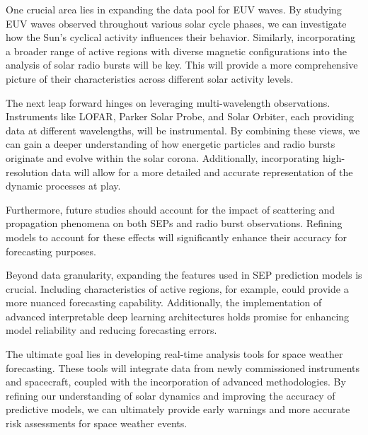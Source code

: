 One crucial area lies in expanding the data pool for EUV waves. By studying EUV waves observed throughout various solar cycle phases, we can investigate how the Sun's cyclical activity influences their behavior. Similarly, incorporating a broader range of active regions with diverse magnetic configurations into the analysis of solar radio bursts will be key. This will provide a more comprehensive picture of their characteristics across different solar activity levels.

The next leap forward hinges on leveraging multi-wavelength observations. Instruments like LOFAR, Parker Solar Probe, and Solar Orbiter, each providing data at different wavelengths, will be instrumental. By combining these views, we can gain a deeper understanding of how energetic particles and radio bursts originate and evolve within the solar corona. Additionally, incorporating high-resolution data will allow for a more detailed and accurate representation of the dynamic processes at play.

Furthermore, future studies should account for the impact of scattering and propagation phenomena on both SEPs and radio burst observations. Refining models to account for these effects will significantly enhance their accuracy for forecasting purposes.

Beyond data granularity, expanding the features used in SEP prediction models is crucial.  Including characteristics of active regions, for example, could provide a more nuanced forecasting capability.  Additionally, the implementation of advanced interpretable deep learning architectures holds promise for enhancing model reliability and reducing forecasting errors.

The ultimate goal lies in developing real-time analysis tools for space weather forecasting. These tools will integrate data from newly commissioned instruments and spacecraft, coupled with the incorporation of advanced methodologies. By refining our understanding of solar dynamics and improving the accuracy of predictive models, we can ultimately provide early warnings and more accurate risk assessments for space weather events.





